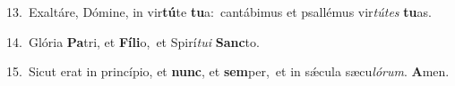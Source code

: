 {\numbfont\textcolor{\numbcolor}{13.}}~Exaltáre, Dómine, in vir\-\textbf{tú}\-te \textbf{tu}\-a:~\star cantábimus et psallémus vir\-\textit{tú}\-\textit{tes} \textbf{tu}\-as.\par
{\numbfont\textcolor{\numbcolor}{14.}}~Glória \textbf{Pa}\-tri, et \textbf{Fí}\-\textbf{li}o,~\star et Spirí\-\textit{tu}\-\textit{i} \textbf{Sanc}\-to.\par
{\numbfont\textcolor{\numbcolor}{15.}}~Sicut erat in princípio, et \textbf{nunc}\-, et \textbf{sem}\-per,~\star et in sǽcula sæcu\-\textit{ló}\-\textit{rum}. \textbf{A}\-men.\par
